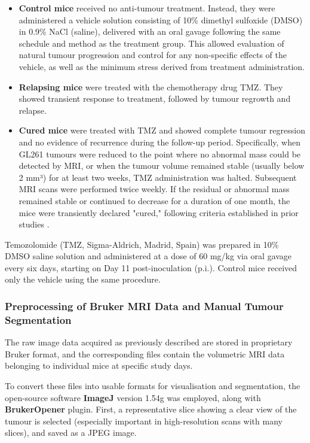 \documentclass[12pt, a4paper]{report}
\begin{document}
\begin{itemize}
    \item \textbf{Control mice} received no anti-tumour treatment. Instead, they were administered a vehicle solution consisting of 10\% dimethyl sulfoxide (DMSO) in 0.9\% NaCl (saline), delivered with an oral gavage following the same schedule and method as the treatment group. This allowed evaluation of natural tumour progression and control for any non-specific effects of the vehicle, as well as the minimum stress derived from treatment administration.
    
    \item \textbf{Relapsing mice} were treated with the chemotherapy drug TMZ. They showed transient response to treatment, followed by tumour  regrowth and relapse.

    \item \textbf{Cured mice} were treated with TMZ and showed complete tumour regression and no evidence of recurrence during the follow-up period. Specifically, when GL261 tumours were reduced to the point where no abnormal mass could be detected by MRI, or when the tumour volume remained stable (usually below 2 mm³) for at least two weeks, TMZ administration was halted. Subsequent MRI scans were performed twice weekly. If the residual or abnormal mass remained stable or continued to decrease for a duration of one month, the mice were transiently declared "cured," following criteria established in prior studies \cite{Wu2015}.
\end{itemize}

Temozolomide (TMZ, Sigma-Aldrich, Madrid, Spain) was prepared in 10\% DMSO saline solution and administered at a dose of 60 mg/kg via oral gavage every six days, starting on Day 11 post-inoculation (p.i.). Control mice received only the vehicle using the same procedure.

\subsubsection{Preprocessing of Bruker MRI Data and Manual Tumour Segmentation}

The raw image data acquired as previously described are stored in proprietary Bruker format, and the corresponding files contain the volumetric MRI data belonging to individual mice at specific study days.

To convert these files into usable formats for visualisation and segmentation, the open-source software \textbf{ImageJ} version 1.54g was employed, along with \textbf{BrukerOpener} plugin. First, a representative slice showing a clear view of the tumour is selected (especially important in high-resolution scans with many slices), and saved as a JPEG image. 
\end{document}
